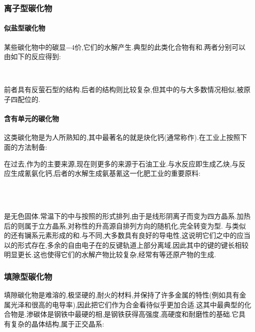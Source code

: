 \documentclass[draft]{ctexart}
\begin{document}
\subsubsection{离子型碳化物}
\paragraph{似盐型碳化物}
某些碳化物中的碳显$-4$价,它们的水解产生.典型的此类化合物有和.两者分别可以由如下的反应得到:
\begin{center}
    \\
\end{center}
前者具有反萤石型的结构.后者的结构则比较复杂,但其中的与大多数情况相似,被原子四配位的.
\paragraph{含有单元的碳化物}
这类碳化物是为人所熟知的,其中最著名的就是炔化钙(通常称作).在工业上按照下面的方法制备:
\begin{center}
\end{center}
在过去,作为的主要来源,现在则更多的来源于石油工业.与水反应即生成乙炔,与反应生成氰氨化钙,后者的水解生成氨基氰这一化肥工业的重要原料:
\begin{center}
    \\
    \\
\end{center}
是无色固体.常温下的中与按照的形式排列,由于是线形阴离子而变为四方晶系.加热后的则属于立方晶系,对称性的升高源自排列方向的随机化,完全转变为型.
与类似的还有镧系元素形成的和.与不同,大多数具有良好的导电性,这说明它们之中的应当以的形式存在,多余的自由电子在的反键轨道上部分离域,因此其中的键的键长相较明显更长.这也使得它们的水解产物比较复杂,经常有等还原产物的生成.
\subsubsection{填隙型碳化物}
填隙碳化物是难溶的,极坚硬的,耐火的材料,并保持了许多金属的特性(例如具有金属光泽和很高的电导率),因此把它们作为合金看待似乎更加合适.这其中最典型的化合物是.渗碳体是钢铁中最硬的相,是钢铁获得高强度,高硬度和耐磨性的基础.它具有复杂的晶体结构,属于正交晶系:
\end{document}
